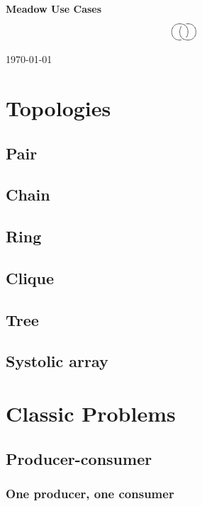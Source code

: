 \documentclass{note}
\begin{document}
\small

\vspace*{0.5cm}

\begin{center}
\textcolor{blue2}{\large\bf Meadow Use Cases}
\\
$$\xy
\xygraph{!{0;/r0.7pc/:} !{\vover}[u]
  !{\hcap[-2]} [d] !{\vover-} [ruu] !{\hcap[2]}}
\endxy$$

\vspace*{0.8cm}

{\small\today}

\vspace*{0.8cm}

\end{center}

\tableofcontents

\section{Topologies}
\subsection{Pair}
\subsection{Chain}
\subsection{Ring}
\subsection{Clique}
\subsection{Tree}
\subsection{Systolic array}

\section{Classic Problems}

\subsection{Producer-consumer}
\subsubsection{One producer, one consumer}
\end{document}
